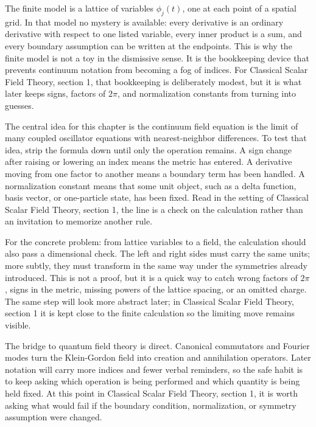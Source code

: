 The finite model is a lattice of variables \(\phi_j(t)\), one at each point of a spatial grid.  In that model no mystery is available: every derivative is an ordinary derivative with respect to one listed variable, every inner product is a sum, and every boundary assumption can be written at the endpoints.  This is why the finite model is not a toy in the dismissive sense.  It is the bookkeeping device that prevents continuum notation from becoming a fog of indices.  For Classical Scalar Field Theory, section 1, that bookkeeping is deliberately modest, but it is what later keeps signs, factors of \(2\pi\), and normalization constants from turning into guesses.

The central idea for this chapter is the continuum field equation is the limit of many coupled oscillator equations with nearest-neighbor differences.  To test that idea, strip the formula down until only the operation remains.  A sign change after raising or lowering an index means the metric has entered.  A derivative moving from one factor to another means a boundary term has been handled.  A normalization constant means that some unit object, such as a delta function, basis vector, or one-particle state, has been fixed.  Read in the setting of Classical Scalar Field Theory, section 1, the line is a check on the calculation rather than an invitation to memorize another rule.

For the concrete problem: from lattice variables to a field, the calculation should also pass a dimensional check.  The left and right sides must carry the same units; more subtly, they must transform in the same way under the symmetries already introduced.  This is not a proof, but it is a quick way to catch wrong factors of \(2\pi\), signs in the metric, missing powers of the lattice spacing, or an omitted charge.  The same step will look more abstract later; in Classical Scalar Field Theory, section 1 it is kept close to the finite calculation so the limiting move remains visible.

The bridge to quantum field theory is direct.  Canonical commutators and Fourier modes turn the Klein-Gordon field into creation and annihilation operators.  Later notation will carry more indices and fewer verbal reminders, so the safe habit is to keep asking which operation is being performed and which quantity is being held fixed.  At this point in Classical Scalar Field Theory, section 1, it is worth asking what would fail if the boundary condition, normalization, or symmetry assumption were changed.

